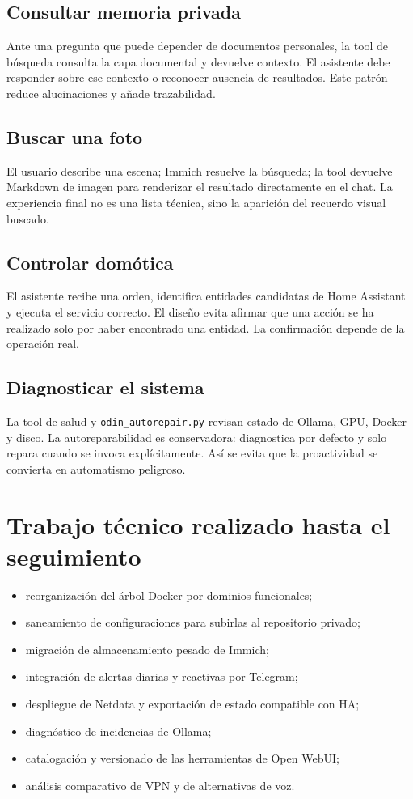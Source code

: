 \subsection{Consultar memoria privada}
Ante una pregunta que puede depender de documentos personales, la tool de búsqueda consulta la capa documental y devuelve contexto. El asistente debe responder sobre ese contexto o reconocer ausencia de resultados. Este patrón reduce alucinaciones y añade trazabilidad.

\subsection{Buscar una foto}
El usuario describe una escena; Immich resuelve la búsqueda; la tool devuelve Markdown de imagen para renderizar el resultado directamente en el chat. La experiencia final no es una lista técnica, sino la aparición del recuerdo visual buscado.

\subsection{Controlar domótica}
El asistente recibe una orden, identifica entidades candidatas de Home Assistant y ejecuta el servicio correcto. El diseño evita afirmar que una acción se ha realizado solo por haber encontrado una entidad. La confirmación depende de la operación real.

\subsection{Diagnosticar el sistema}
La tool de salud y \texttt{odin\_autorepair.py} revisan estado de Ollama, GPU, Docker y disco. La autoreparabilidad es conservadora: diagnostica por defecto y solo repara cuando se invoca explícitamente. Así se evita que la proactividad se convierta en automatismo peligroso.

\section{Trabajo técnico realizado hasta el seguimiento}
\begin{itemize}
  \item reorganización del árbol Docker por dominios funcionales;
  \item saneamiento de configuraciones para subirlas al repositorio privado;
  \item migración de almacenamiento pesado de Immich;
  \item integración de alertas diarias y reactivas por Telegram;
  \item despliegue de Netdata y exportación de estado compatible con HA;
  \item diagnóstico de incidencias de Ollama;
  \item catalogación y versionado de las herramientas de Open WebUI;
  \item análisis comparativo de VPN y de alternativas de voz.
\end{itemize}

